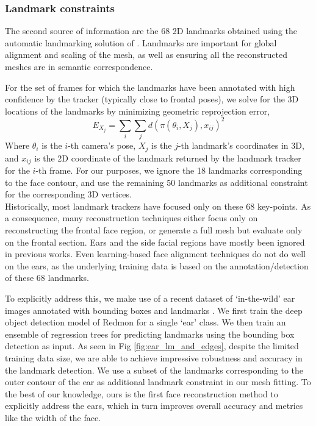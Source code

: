 \documentclass[10pt,twocolumn,letterpaper]{article}
\begin{document}
 
 \subsubsection{Landmark constraints}

 The second source of information are the 68 2D landmarks obtained using the automatic landmarking solution of \cite{baltrusaitis2018openface}. Landmarks are important for global alignment and scaling of the mesh, as well as ensuring all the reconstructed meshes are in semantic correspondence.
 
 For the set of frames for which the landmarks have been annotated with high confidence by the tracker (typically close to frontal poses), we solve for the 3D locations of the landmarks by minimizing geometric reprojection error, 
 \begin{equation}
    E_{X_{j}} = \sum_{i} \sum_{j} d(\pi (\theta_{i},X_{j}),x_{ij})^2
\end{equation}
Where $\theta_i$ is the $i$-th camera's pose, $X_{j}$ is the $j$-th landmark's coordinates in 3D, and $x_{ij}$ is the 2D coordinate of the landmark returned by the landmark tracker for the $i$-th frame. For our purposes, we ignore the 18 landmarks corresponding to the face contour, and use the remaining 50 landmarks as additional constraint for the corresponding 3D vertices.\\


Historically, most landmark trackers have focused only on these 68 key-points. As a consequence, many reconstruction techniques either focus only on reconstructing the frontal face region, or generate a full mesh but evaluate only on the frontal section. Ears and the side facial regions have mostly been ignored in previous works. Even learning-based face alignment techniques do not do well on the ears, as the underlying training data is based on the annotation/detection of these 68 landmarks.

To explicitly address this, we make use of a recent dataset of `in-the-wild' ear images annotated with bounding boxes and landmarks \cite{zhou2017deformable}. We first train the deep object detection model of Redmon \etal \cite{redmon2017yolo9000} for a single `ear' class. We then train an ensemble of regression trees \cite{kazemi2014one} for predicting landmarks using the bounding box detection as input. As seen in Fig \ref{fig:ear_lm_and_edges}, despite the limited training data size, we are able to achieve impressive robustness and accuracy in the landmark detection. We use a subset of the landmarks corresponding to the outer contour of the ear as additional landmark constraint in our mesh fitting. To the best of our knowledge, ours is the first face reconstruction method to explicitly address the ears, which in turn improves overall accuracy and metrics like the width of the face.
\end{document}
